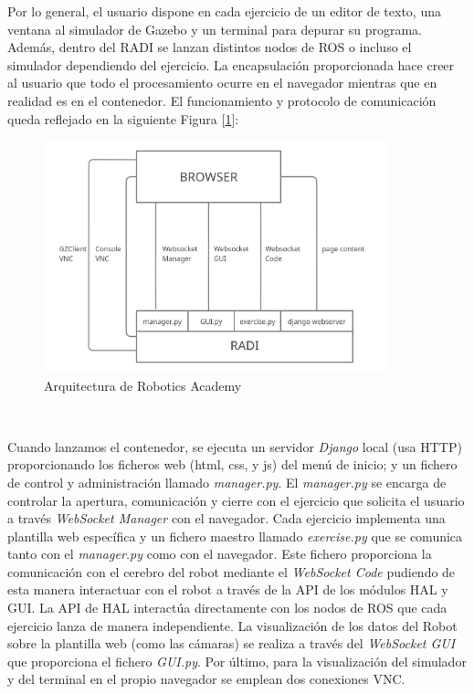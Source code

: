 Por lo general, el usuario dispone en cada ejercicio de un editor de texto, una ventana al simulador de Gazebo y un terminal para depurar su programa. Además, dentro del RADI se lanzan distintos nodos de ROS o incluso el simulador dependiendo del ejercicio. La encapsulación proporcionada hace creer al usuario que todo el procesamiento ocurre en el navegador mientras que en realidad es en el contenedor. El funcionamiento y protocolo de comunicación queda reflejado en la siguiente Figura [\ref{fig:arquitectura_robotics_academy}]:\\

\begin{figure} [H]
  \begin{center}
    \includegraphics[width=10cm]{imagenes/cap3/robotics_academy_architecture.png}
  \end{center}
  \caption{Arquitectura de Robotics Academy}
  \label{fig:arquitectura_robotics_academy}
\end{figure}\

Cuando lanzamos el contenedor, se ejecuta un servidor \textit{Django} local (usa HTTP) proporcionando los ficheros web (html, css, y js) del menú de inicio; y un fichero de control y administración llamado \textit{manager.py}. El \textit{manager.py} se encarga de controlar la apertura, comunicación y cierre con el ejercicio que solicita el usuario a través \textit{WebSocket Manager} con el navegador. Cada ejercicio implementa una plantilla web específica y un fichero maestro llamado \textit{exercise.py} que se comunica tanto con el \textit{manager.py} como con el navegador. Este fichero proporciona la comunicación con el cerebro del robot mediante el \textit{WebSocket Code} pudiendo de esta manera interactuar con el robot a través de la API de los módulos HAL y GUI. La API de HAL interactúa directamente con los nodos de ROS que cada ejercicio lanza de manera independiente. La visualización de los datos del Robot sobre la plantilla web (como las cámaras) se realiza a través del \textit{WebSocket GUI} que proporciona el fichero \textit{GUI.py}. Por último, para la visualización del simulador y del terminal en el propio navegador se emplean dos conexiones VNC.\\

